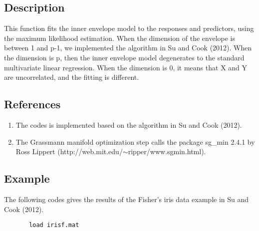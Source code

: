 \documentclass[a4paper,11pt,openany]{memoir}
\begin{document}
\subsection*{Description}

\begin{par}
This function fits the inner envelope model to the responses and predictors, using the maximum likelihood estimation.  When the dimension of the envelope is between 1 and p-1, we implemented the algorithm in Su and Cook (2012).  When the dimension is p, then the inner envelope model degenerates to the standard multivariate linear regression.  When the dimension is 0, it means that X and Y are uncorrelated, and the fitting is different.
\end{par} \vspace{1em}


\subsection*{References}

\begin{enumerate}
\setlength{\itemsep}{-1ex}
   \item The codes is implemented based on the algorithm in Su and Cook (2012).
   \item The Grassmann manifold optimization step calls the package sg\_min 2.4.1 by Ross Lippert (http://web.mit.edu/$\sim$ripper/www.sgmin.html).
\end{enumerate}


\subsection*{Example}

\begin{par}
The following codes gives the results of the Fisher's iris data example in Su and Cook (2012).
\end{par} \vspace{1em}

\begin{verbatim}       load irisf.mat\end{verbatim}
    
\end{document}

